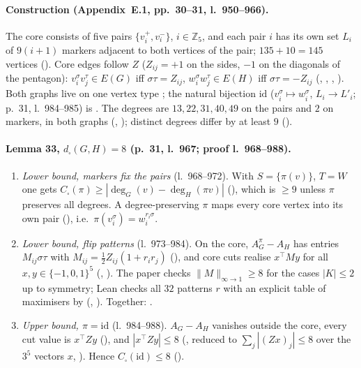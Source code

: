 \paragraph{Construction (Appendix~E.1, pp.~30--31, l.~950--966).} The core consists of five pairs $\{v_i^+,v_i^-\}$, $i\in\mathbb Z_5$, and each pair $i$
has its own set $L_i$ of $9(i+1)$ markers adjacent to both vertices of the pair; $135+10=145$ vertices
(). Core edges follow $Z$ ($Z_{ij}=+1$ on the sides, $-1$ on the diagonals of the pentagon):
$v^\sigma_iv^\tau_j\in E(G)$ iff $\sigma\tau=Z_{ij}$, $w^\sigma_iw^\tau_j\in E(H)$ iff $\sigma\tau=-Z_{ij}$
(, , , ). Both graphs live on one vertex type ; the natural
bijection $\mathrm{id}$ ($v_i^\sigma\mapsto w_i^\sigma$, $L_i\to L'_i$; p.~31, l.~984--985) is . The degrees are $13,22,31,40,49$ on the pairs and $2$ on markers, in both
graphs (, ); distinct degrees differ by at least $9$ ().

\paragraph{Lemma 33, $d_\square(G,H)=8$ (p.~31, l.~967; proof l.~968--988).}
\begin{enumerate}
\item \emph{Lower bound, markers fix the pairs} (l.~968--972). With $S=\{\pi(v)\}$, $T=W$ one gets
$C_\square(\pi)\ge|\deg_G(v)-\deg_H(\pi v)|$ (), which is $\ge9$ unless $\pi$ preserves all degrees.
A degree-preserving $\pi$ maps every core vertex into its own pair (), i.e.\ $\pi(v_i^\sigma)=w_i^{r_i\sigma}$.
\item \emph{Lower bound, flip patterns} (l.~973--984). On the core, $A^\pi_G-A_H$ has entries $M_{ij}\sigma\tau$ with
$M_{ij}=\frac12Z_{ij}(1+r_ir_j)$ (), and core cuts realise $x^\top My$ for all $x,y\in\{-1,0,1\}^5$
(, ). The paper checks $\|M\|_{\infty\to1}\ge8$ for the cases $|K|\le2$ up to
symmetry; Lean checks all $32$ patterns $r$ with an explicit table of maximisers  by 
(, ). Together: .
\item \emph{Upper bound, $\pi=\mathrm{id}$} (l.~984--988). $A_G-A_H$ vanishes outside the core, every cut value is $x^\top Zy$
(), and $|x^\top Zy|\le8$ (, reduced to $\sum_j|(Zx)_j|\le8$ over the $3^5$
vectors $x$, ). Hence $C_\square(\mathrm{id})\le8$ ().
\end{enumerate}

